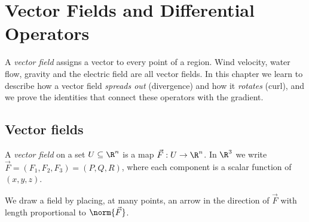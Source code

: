 \chapter{Vector Fields and Differential Operators}
\label{ch:fields}

A \emph{vector field} assigns a vector to every point of a region. Wind velocity, water flow, gravity and the electric field are all vector fields. In this chapter we learn to describe how a vector field \emph{spreads out} (divergence) and how it \emph{rotates} (curl), and we prove the identities that connect these operators with the gradient.

\section{Vector fields}

\begin{definition}
A \emph{vector field} on a set $U\subseteq\R^n$ is a map $\vec F:U\to\R^n$. In $\R^3$ we write $\vec F=(F_1,F_2,F_3)=(P,Q,R)$, where each component is a scalar function of $(x,y,z)$.
\end{definition}

We draw a field by placing, at many points, an arrow in the direction of $\vec F$ with length proportional to $\norm{\vec F}$.

